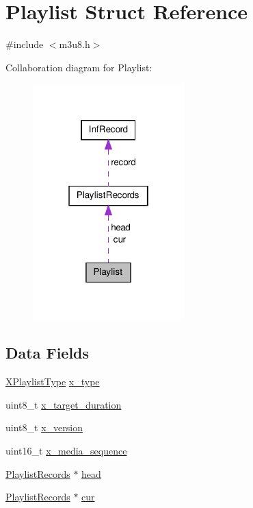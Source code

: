 \hypertarget{struct_playlist}{\section{\-Playlist \-Struct \-Reference}
\label{struct_playlist}
}


{\ttfamily \#include $<$m3u8.\-h$>$}



\-Collaboration diagram for \-Playlist\-:
\nopagebreak
\begin{figure}[H]
\begin{center}
\leavevmode
\includegraphics[width=166pt]{struct_playlist__coll__graph}
\end{center}
\end{figure}
\subsection*{\-Data \-Fields}
\begin{DoxyCompactItemize}
\item 
\hyperlink{m3u8_8h_a10b575ed914a0da1857ff058a326b7d2}{\-X\-Playlist\-Type} \hyperlink{struct_playlist_a37c60895b60bcb1cc626eae5885e0540}{x\-\_\-type}
\item 
uint8\-\_\-t \hyperlink{struct_playlist_a6362cba4f7d923dd7687284f0a890017}{x\-\_\-target\-\_\-duration}
\item 
uint8\-\_\-t \hyperlink{struct_playlist_adbfa9836e57d677968274360b90147ce}{x\-\_\-version}
\item 
uint16\-\_\-t \hyperlink{struct_playlist_a5777a3f8846ff7f63461d4a0bad7ad09}{x\-\_\-media\-\_\-sequence}
\item 
\hyperlink{struct_playlist_records}{\-Playlist\-Records} $\ast$ \hyperlink{struct_playlist_adbbc6e0a2881880caf79e9b2d0ee9d09}{head}
\item 
\hyperlink{struct_playlist_records}{\-Playlist\-Records} $\ast$ \hyperlink{struct_playlist_a0d3665b271a9105ad516c49c5572c77b}{cur}
\end{DoxyCompactItemize}


